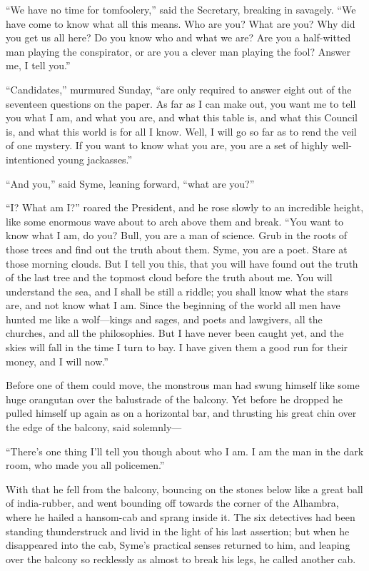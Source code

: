 “We have no time for tomfoolery,” said the Secretary, breaking in savagely. “We have come to know what all this means. Who are you? What are you? Why did you get us all here? Do you know who and what we are? Are you a half-witted man playing the conspirator, or are you a clever man playing the fool? Answer me, I tell you.”

“Candidates,” murmured Sunday, “are only required to answer eight out of the seventeen questions on the paper. As far as I can make out, you want me to tell you what I am, and what you are, and what this table is, and what this Council is, and what this world is for all I know. Well, I will go so far as to rend the veil of one mystery. If you want to know what you are, you are a set of highly well-intentioned young jackasses.”

“And you,” said Syme, leaning forward, “what are you?”

“I? What am I?” roared the President, and he rose slowly to an incredible height, like some enormous wave about to arch above them and break. “You want to know what I am, do you? Bull, you are a man of science. Grub in the roots of those trees and find out the truth about them. Syme, you are a poet. Stare at those morning clouds. But I tell you this, that you will have found out the truth of the last tree and the topmost cloud before the truth about me. You will understand the sea, and I shall be still a riddle; you shall know what the stars are, and not know what I am. Since the beginning of the world all men have hunted me like a wolf⁠—kings and sages, and poets and lawgivers, all the churches, and all the philosophies. But I have never been caught yet, and the skies will fall in the time I turn to bay. I have given them a good run for their money, and I will now.”

Before one of them could move, the monstrous man had swung himself like some huge orangutan over the balustrade of the balcony. Yet before he dropped he pulled himself up again as on a horizontal bar, and thrusting his great chin over the edge of the balcony, said solemnly⁠—

“There’s one thing I’ll tell you though about who I am. I am the man in the dark room, who made you all policemen.”

With that he fell from the balcony, bouncing on the stones below like a great ball of india-rubber, and went bounding off towards the corner of the Alhambra, where he hailed a hansom-cab and sprang inside it. The six detectives had been standing thunderstruck and livid in the light of his last assertion; but when he disappeared into the cab, Syme’s practical senses returned to him, and leaping over the balcony so recklessly as almost to break his legs, he called another cab.

